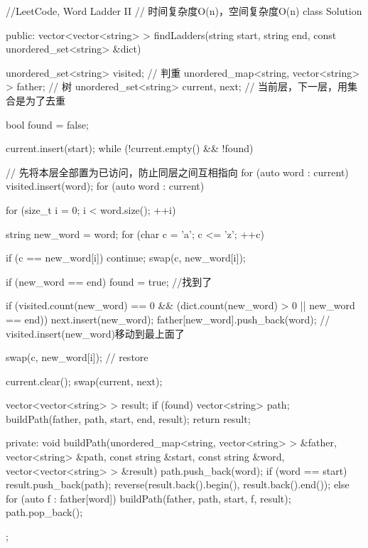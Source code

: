 \begin{Code}
//LeetCode, Word Ladder II
// 时间复杂度O(n)，空间复杂度O(n)
class Solution {
public:
    vector<vector<string> > findLadders(string start, string end,
            const unordered_set<string> &dict) {
        unordered_set<string> visited; // 判重
        unordered_map<string, vector<string> > father; // 树
        unordered_set<string> current, next;  // 当前层，下一层，用集合是为了去重

        bool found = false;

        current.insert(start);
        while (!current.empty() && !found) {
            // 先将本层全部置为已访问，防止同层之间互相指向
            for (auto word : current)
                visited.insert(word);
            for (auto word : current) {
                for (size_t i = 0; i < word.size(); ++i) {
                    string new_word = word;
                    for (char c = 'a'; c <= 'z'; ++c) {
                        if (c == new_word[i]) continue;
                        swap(c, new_word[i]);

                        if (new_word == end) found = true; //找到了

                        if (visited.count(new_word) == 0
                                && (dict.count(new_word) > 0 ||
                                        new_word == end)) {
                            next.insert(new_word);
                            father[new_word].push_back(word);
                            // visited.insert(new_word)移动到最上面了
                        }

                        swap(c, new_word[i]);  // restore
                    }
                }
            }

            current.clear();
            swap(current, next);
        }
        vector<vector<string> > result;
        if (found) {
            vector<string> path;
            buildPath(father, path, start, end, result);
        }
        return result;
    }
private:
    void buildPath(unordered_map<string, vector<string> > &father,
            vector<string> &path, const string &start, const string &word,
            vector<vector<string> > &result) {
        path.push_back(word);
        if (word == start) {
            result.push_back(path);
            reverse(result.back().begin(), result.back().end());
        } else {
            for (auto f : father[word]) {
                buildPath(father, path, start, f, result);
            }
        }
        path.pop_back();
    }
};
\end{Code}


